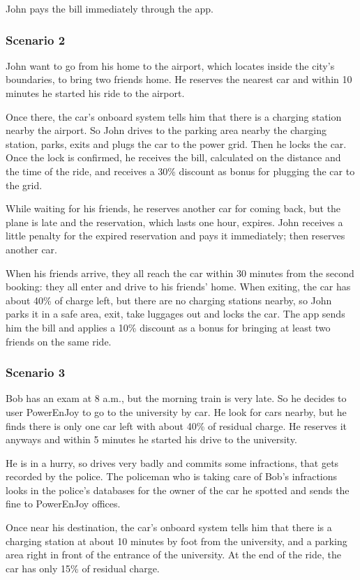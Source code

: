 \documentclass[11pt]{article} %
\newcommand{\pe}{PowerEnJoy }
\begin{document}
John pays the bill immediately through the app.

\subsubsection{Scenario 2}
John want to go from his home to the airport, which locates inside the city's boundaries, to bring two friends home. He reserves the nearest car and within 10 minutes he started his ride to the airport.

Once there, the car's onboard system tells him that there is a charging station nearby the airport. So John drives to the parking area nearby the charging station, parks, exits and plugs the car to the power grid. Then he locks the car.
Once the lock is confirmed, he receives the bill, calculated on the distance and the time of the ride, and receives a 30\% discount as bonus for plugging the car to the grid.

While waiting for his friends, he reserves another car for coming back, but the plane is late and the reservation, which lasts one hour, expires. John receives a little penalty for the expired reservation and pays it immediately; then reserves another car.

When his friends arrive, they all reach the car within 30 minutes from the second booking: they all enter and drive to his friends' home. When exiting, the car has about 40\% of charge left, but there are no charging stations nearby, so John parks it in a safe area, exit, take luggages out and locks the car. The app sends him the bill and applies a 10\% discount as a bonus for bringing at least two friends on the same ride.


\subsubsection{Scenario 3}
Bob has an exam at 8 a.m., but the morning train is very late. So he decides to user \pe to go to the university by car. He look for cars nearby, but he finds there is only one car left with about 40\% of residual charge. He reserves it anyways and within 5 minutes he started his drive to the university.

He is in a hurry, so drives very badly and commits some infractions, that gets recorded by the police. The policeman who is taking care of Bob's infractions looks in the police's databases for the owner of the car he spotted and sends the fine to \pe offices.

Once near his destination, the car's onboard system tells him that there is a charging station at about 10 minutes by foot from the university, and a parking area right in front of the entrance of the university. At the end of the ride, the car has only 15\% of residual charge.
\end{document}
